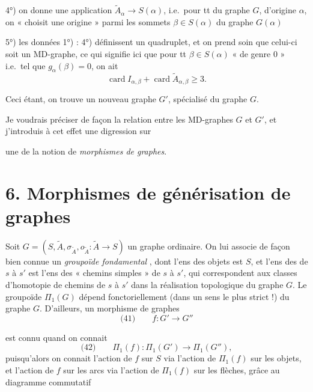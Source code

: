 \documentclass[11pt,a4paper]{article}
\begin{document}
4°) on donne une application $\tilde{A}_\alpha \to S(\alpha)$, i.e.\ pour tt   du graphe $G$, d'origine $\alpha$, on  « choisit une  origine » parmi les sommets $\beta \in S(\alpha)$ du graphe $G(\alpha)$

5°) les données 1°) : 4°) définissent un  quadruplet, et on prend soin que celui-ci soit un MD-graphe, \struck{\ill{}} ce qui signifie ici que pour tt $\beta \in S(\alpha)$ « de genre 0 » i.e.\ tel que $g_\alpha(\beta) = 0$, on ait
\[
\operatorname{card} I_{\alpha,\beta} + \operatorname{card} \tilde{A}_{\alpha,\beta} \geqslant 3 .
\]

Ceci étant, on trouve un nouveau graphe $G'$,  spécialisé du graphe $G$.

Je voudrais préciser de façon  la relation entre les MD-graphes $G$ et $G'$, et j'introduis à cet effet une digression sur

une  de la notion de \emph{morphismes de graphes}.


\section{6. Morphismes de générisation de graphes \add{\ill{}} }

Soit $G = (S, \tilde{A}, \sigma_{\tilde{A}}, o_{\tilde{A}} : \tilde{A} \to S)$ un graphe ordinaire. On lui associe de façon bien connue un \emph{groupoïde fondamental} , dont l'ens des objets est $S$, et l'ens des \struck{\ill{}}  de $s$ à $s'$ est l'ens des « chemins simples » de $s$ à $s'$, qui correspondent aux classes d'homotopie de chemins de $s$ à $s'$ dans la réalisation topologique du graphe $G$. Le groupoïde $\Pi_1(G)$ dépend fonctoriellement (dans un sens le plus strict !) du graphe $G$. D'ailleurs, un morphisme de graphes
\[
\text{(41)}\qquad f : G' \to G''
\]

est connu quand on connait
\[
\text{(42)}\qquad \Pi_1(f) : \Pi_1(G') \to \Pi_1(G'') ,
\]
puisqu'alors on connait l'action de $f$ sur $S$ via l'action de $\Pi_1(f)$ sur les objets, et l'action de $f$ sur les arcs via l'action de $\Pi_1(f)$ sur les flèches, grâce au diagramme commutatif

\end{document}
